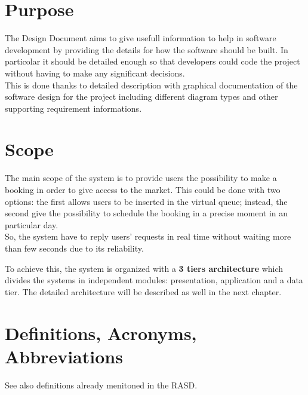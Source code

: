 \section{Purpose}
The Design Document aims to give usefull information to help in software development by providing the details for how the software should be built. In particolar it should be detailed enough so that developers could code the project without having to make any significant decisions. \\
This is done thanks to detailed description with graphical documentation of the software design for the project including different diagram types and other supporting requirement informations.
\section{Scope}
The main scope of the system is to provide users the possibility to make a booking in order to give access to the market. This could be done with two options: the first allows users to be inserted in the virtual queue; instead, the second give the possibility to schedule the booking in a precise moment in an particular day. \\
So, the system have to reply users' requests in real time without waiting more than few seconds due to its reliability. \par
To achieve this, the system is organized with a \textbf{3 tiers architecture} which divides the systems in independent modules: presentation, application and a data tier. The detailed architecture will be described as well in the next chapter.

\bigskip
\bigskip
\section{Definitions, Acronyms, Abbreviations}
See also definitions already menitoned in the RASD.
